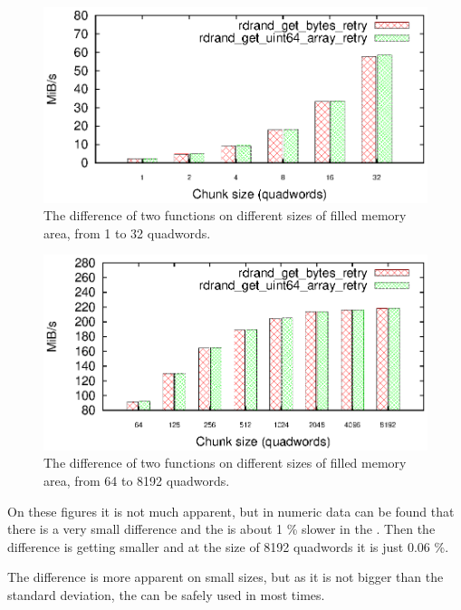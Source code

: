 \begin{figure}[h!]
  \centering
 \includegraphics[width=12cm]{fig/tests/sizeDependency_low.eps} %
\caption{The difference of two functions on different sizes of filled memory area, from 1 to 32 quadwords.}
\label{fig:testing:bytesArrayLow}
\end{figure}

\begin{figure}[h!]
  \centering
 \includegraphics[width=12cm]{fig/tests/sizeDependency_hi.eps} %
\caption{The difference of two functions on different sizes of filled memory area, from 64 to 8192 quadwords.}
\label{fig:testing:bytesArrayHi}
\end{figure}

On these figures it is not much apparent, but in numeric data can be found that there is a very small difference and the  is about 1 \%  slower in the . Then the difference is getting smaller and at the size of 8192 quadwords it is just 0.06 \%. 

The difference is more apparent on small sizes, but as it is not bigger than the standard deviation, the  can be safely used in most times.




